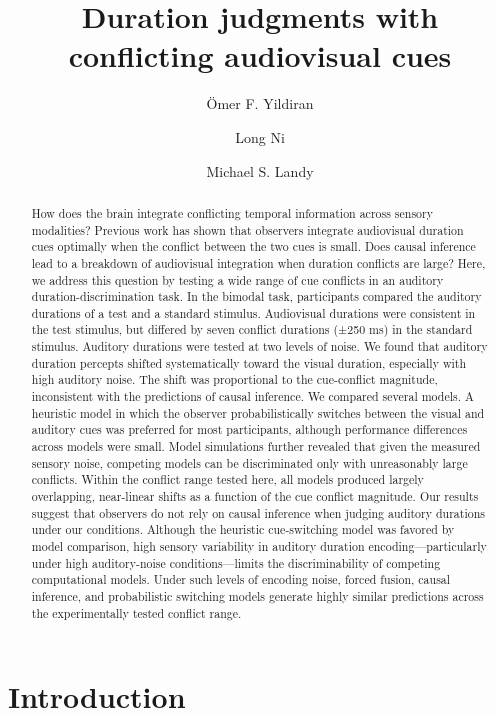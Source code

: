 \documentclass[9pt,lineno,doublespacing]{elife}
\title{Duration judgments with conflicting audiovisual cues}
\author[1*]{Ömer F. Yildiran}
\author[1]{Long Ni}
\author[1,2]{Michael S. Landy}
\affil[1]{Department of Psychology, New York University, New York, NY}
\affil[2]{Center for Neural Science, New York University, New York, NY}
\begin{document}
\maketitle

\begin{abstract}
How does the brain integrate conflicting temporal information across sensory modalities? Previous work has shown that observers integrate audiovisual duration cues optimally when the conflict between the two cues is small. Does causal inference lead to a breakdown of audiovisual integration when duration conflicts are large? Here, we address this question by testing a wide range of cue conflicts in an auditory duration-discrimination task. In the bimodal task, participants compared the auditory durations of a test and a standard stimulus. Audiovisual durations were consistent in the test stimulus, but differed by seven conflict durations (±250 ms) in the standard stimulus. Auditory durations were tested at two levels of noise. We found that auditory duration percepts shifted systematically toward the visual duration, especially with high auditory noise. The shift was proportional to the cue-conflict magnitude, inconsistent with the predictions of causal inference. We compared several models. A heuristic model in which the observer probabilistically switches between the visual and auditory cues was preferred for most participants, although performance differences across models were small. Model simulations further revealed that given the measured sensory noise, competing models can be discriminated only with unreasonably large conflicts. Within the conflict range tested here, all models produced largely overlapping, near-linear shifts as a function of the cue conflict magnitude. Our results suggest that observers do not rely on causal inference when judging auditory durations under our conditions. Although the heuristic cue-switching model was favored by model comparison, high sensory variability in auditory duration encoding---particularly under high auditory-noise conditions---limits the discriminability of competing computational models. Under such levels of encoding noise, forced fusion, causal inference, and probabilistic switching models generate highly similar predictions across the experimentally tested conflict range.


\end{abstract}


\newpage
\section{Introduction}
\end{document}
